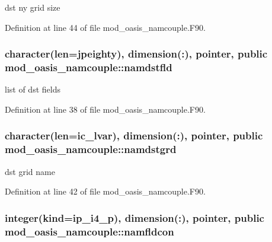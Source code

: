 dst ny grid size 



Definition at line 44 of file mod\+\_\+oasis\+\_\+namcouple.\+F90.

\hypertarget{classmod__oasis__namcouple_ac4cfec209e4169b6098f9a8b9be1ffb1}{
\subsubsection[{namdstfld}]{\setlength{\rightskip}{0pt plus 5cm}character(len={\bf jpeighty}), dimension(\+:), pointer, public mod\+\_\+oasis\+\_\+namcouple\+::namdstfld}}\label{classmod__oasis__namcouple_ac4cfec209e4169b6098f9a8b9be1ffb1}


list of dst fields 



Definition at line 38 of file mod\+\_\+oasis\+\_\+namcouple.\+F90.

\hypertarget{classmod__oasis__namcouple_a7a2ed64b0670db38d2287f5d452060e4}{
\subsubsection[{namdstgrd}]{\setlength{\rightskip}{0pt plus 5cm}character(len=ic\+\_\+lvar), dimension(\+:), pointer, public mod\+\_\+oasis\+\_\+namcouple\+::namdstgrd}}\label{classmod__oasis__namcouple_a7a2ed64b0670db38d2287f5d452060e4}


dst grid name 



Definition at line 42 of file mod\+\_\+oasis\+\_\+namcouple.\+F90.

\hypertarget{classmod__oasis__namcouple_a96aa6a31ef021468f807819a84b327c3}{
\subsubsection[{namfldcon}]{\setlength{\rightskip}{0pt plus 5cm}integer(kind=ip\+\_\+i4\+\_\+p), dimension(\+:), pointer, public mod\+\_\+oasis\+\_\+namcouple\+::namfldcon}}\label{classmod__oasis__namcouple_a96aa6a31ef021468f807819a84b327c3}



